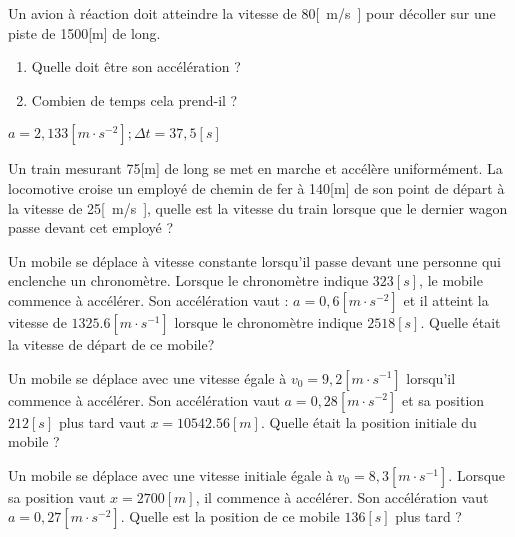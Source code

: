 \begin{exercise}
  Un avion à réaction doit atteindre la vitesse de 80\unit{[m/s]} pour décoller sur une piste de 1500[m] de long.
  \begin{enumerate}[label=\alph*)]
    \item Quelle doit être son accélération ?
    \item Combien de temps cela prend-il ?
  \end{enumerate}
\end{exercise}
\begin{solution}
  \(a=2,133\unit{[m \cdot s^{-2}]} ; \Delta t=37,5\unit{[s]}\)
\end{solution}

\begin{exercise}[difficulty=**]
  Un train mesurant 75[m] de long se met en marche et accélère uniformément. La locomotive croise un employé de chemin de fer à 140[m] de son point de départ à la vitesse de 25\unit{[m/s]}, quelle est la vitesse du train lorsque que le dernier wagon passe devant cet employé ?
\end{exercise}

\begin{exercise}
  Un mobile se déplace à vitesse constante lorsqu'il passe devant une personne qui enclenche un chronomètre. Lorsque le chronomètre indique \(323\unit{[s]}\), le mobile commence à accélérer. Son accélération vaut : \(a=0,6\unit{[m \cdot s^{-2}]}\) et il atteint la vitesse de \(\num{1325,6}\unit{[m \cdot s^{-1}]}\) lorsque le chronomètre indique \(\num{2518}\unit{[s]}\). Quelle était la vitesse de départ de ce mobile?
\end{exercise}



\begin{exercise}
  Un mobile se déplace avec une vitesse égale à \(v_0=9,2\unit{[m \cdot s^{-1}]}\) lorsqu'il commence à accélérer. Son accélération vaut \(a=0,28\unit{[m \cdot s^{-2}]}\) et sa position \(212\unit{[s]}\) plus tard vaut \(x=\num{10542,56}[m]\).
  Quelle était la position initiale du mobile ?
\end{exercise}


\begin{exercise}
  Un mobile se déplace avec une vitesse initiale égale à \(v_0=8,3\unit{[m \cdot s^{-1}]}\).
  Lorsque sa position vaut \(x=2700[m]\), il commence à accélérer. Son accélération vaut \(a=0,27\unit{[m \cdot s^{-2}]}\).
  Quelle est la position de ce mobile \(136\unit{[s]}\) plus tard ?
\end{exercise}



